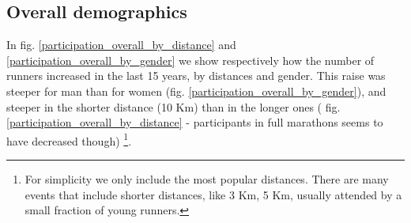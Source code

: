 \documentclass[fleqn,10pt]{wlscirep}
\begin{document}
 		\subsection*{Overall demographics}
 	
 	In fig. \ref{participation_overall_by_distance} and \ref{participation_overall_by_gender} we show respectively how the number of runners increased in the last 15 years, by distances and gender. 
 	This raise was steeper for man than for women (fig. \ref{participation_overall_by_gender}), and steeper in the shorter distance (10 Km) than in the longer ones ( fig. \ref{participation_overall_by_distance} - participants in full marathons seems to have decreased though) \footnote{For simplicity we only include the most popular distances. 
 		There are many events that include shorter distances, like 3 Km, 5 Km, usually attended by a small fraction of young runners.}.
 	
\end{document}
